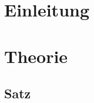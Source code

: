 \documentclass[10pt]{article}
\begin{document}
\section{Einleitung}
\blindtext

\newpage

\section{Theorie}
\blindtext
\subsection{Satz}
\blindtext

\blindtext

\blindtext

\blindtext
\end{document}

